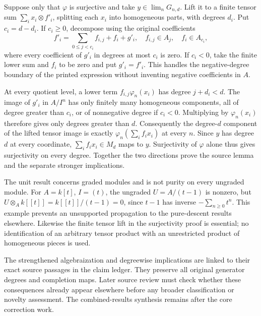 Suppose only that \(\varphi\) is surjective and take \(y\in\lim_nG_{n,d}\). Lift it to a finite tensor sum \(\sum_i x_i\otimes f'_i\), splitting each \(x_i\) into homogeneous parts, with degrees \(d_i\). Put \(c_i=d-d_i\). If \(c_i\geq0\), decompose using the original coefficients \[
f'_i=\sum_{0\leq j<c_i}f_{i,j}+f_i+g'_i,
\quad f_{i,j}\in A_j,\quad f_i\in A_{c_i},
\] where every coefficient of \(g'_i\) in degrees at most \(c_i\) is zero. If \(c_i<0\), take the finite lower sum and \(f_i\) to be zero and put \(g'_i=f'_i\). This handles the negative-degree boundary of the printed expression without inventing negative coefficients in \(A\).

At every quotient level, a lower term \(f_{i,j}\varphi_n(x_i)\) has degree \(j+d_i<d\). The image of \(g'_i\) in \(A/I^n\) has only finitely many homogeneous components, all of degree greater than \(c_i\), or of nonnegative degree if \(c_i<0\). Multiplying by \(\varphi_n(x_i)\) therefore gives only degrees greater than \(d\). Consequently the degree-\(d\) component of the lifted tensor image is exactly \(\varphi_n(\sum_i f_ix_i)\) at every \(n\). Since \(y\) has degree \(d\) at every coordinate, \(\sum_i f_ix_i\in M_d\) maps to \(y\). Surjectivity of \(\varphi\) alone thus gives surjectivity on every degree. Together the two directions prove the source lemma and the separate stronger implications.

The unit result concerns graded modules and is not purity on every ungraded module. For \(A=k[t]\), \(I=(t)\), the ungraded \(U=A/(t-1)\) is nonzero, but \(U\otimes_A k[[t]]=k[[t]]/(t-1)=0\), since \(t-1\) has inverse \(-\sum_{n\geq0}t^n\). This example prevents an unsupported propagation to the pure-descent results elsewhere. Likewise the finite tensor lift in the surjectivity proof is essential; no identification of an arbitrary tensor product with an unrestricted product of homogeneous pieces is used.

The strengthened algebraization and degreewise implications are linked to their exact source passages in the claim ledger. They preserve all original generator degrees and completion maps. Later source review must check whether these consequences already appear elsewhere before any broader classification or novelty assessment. The combined-results synthesis remains after the core correction work.
